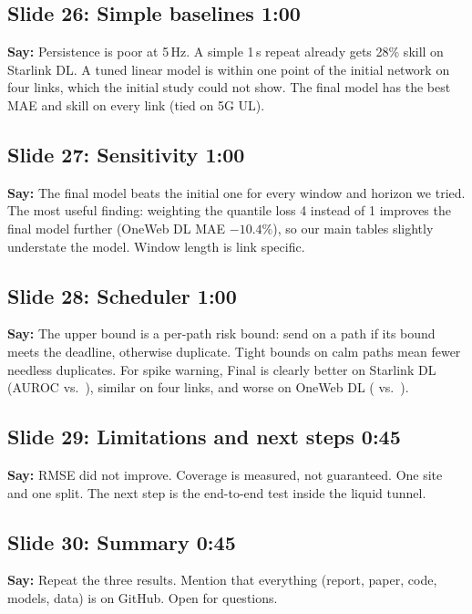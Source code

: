 \documentclass[11pt]{article}
\newcommand{\slide}[3]{\subsection*{Slide #1: #2 \hfill{\normalsize\color{gray}#3}}}
\newcommand{\say}{\textbf{Say:} }
\begin{document}
\slide{26}{Simple baselines}{1:00}
\say Persistence is poor at 5\,Hz. A simple 1\,s repeat already gets 28\% skill on Starlink DL. A tuned linear model is within one point of the initial network on four links, which the initial study could not show. The final model has the best MAE and skill on every link (tied on 5G UL).

\slide{27}{Sensitivity}{1:00}
\say The final model beats the initial one for every window and horizon we tried. The most useful finding: weighting the quantile loss 4 instead of 1 improves the final model further (OneWeb DL MAE $-10.4\%$), so our main tables slightly understate the model. Window length is link specific.

\slide{28}{Scheduler}{1:00}
\say The upper bound is a per-path risk bound: send on a path if its bound meets the deadline, otherwise duplicate. Tight bounds on calm paths mean fewer needless duplicates. For spike warning, Final is clearly better on Starlink DL (AUROC \AUCYthreeSLDL{} vs.\ \AUCYtwoSLDL), similar on four links, and worse on OneWeb DL (\AUCYthreeOWDL{} vs.\ \AUCYtwoOWDL).

\slide{29}{Limitations and next steps}{0:45}
\say RMSE did not improve. Coverage is measured, not guaranteed. One site and one split. The next step is the end-to-end test inside the liquid tunnel.

\slide{30}{Summary}{0:45}
\say Repeat the three results. Mention that everything (report, paper, code, models, data) is on GitHub. Open for questions.
\end{document}
